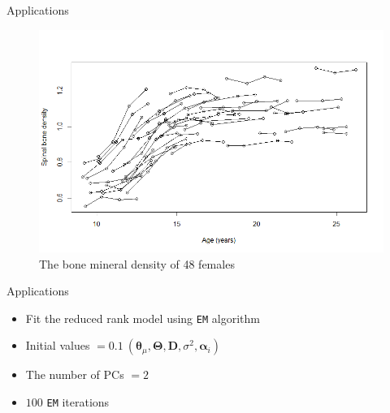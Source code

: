 \documentclass{beamer}
\def \btheta {\boldsymbol{\theta}}
\def \bTheta {\boldsymbol{\Theta}}
\def \balpha {\boldsymbol{\alpha}}
\begin{document}
\begin{frame}{Applications}
	\begin{figure}[h] %
		\begin{center}
			\includegraphics[width=0.8\linewidth]{img/curve.png}
		\end{center}
		\caption{The bone mineral density of 48 females}
		\label{fig:long}
		\label{fig:onecol}
	\end{figure}
\end{frame}

\begin{frame}{Applications}
	\begin{itemize}
		\item {
			Fit the reduced rank model using \texttt{EM} algorithm
		}			
		\item {
			Initial values $=0.1 \ (\btheta_{\mu}, \bTheta, \mathbf{D}, \sigma^2, \balpha_i)$
		}
		\item {
			The number of PCs $=2$
		}
		\item {
			$100$ \texttt{EM} iterations
		}
	\end{itemize}
\end{frame}
\end{document}
